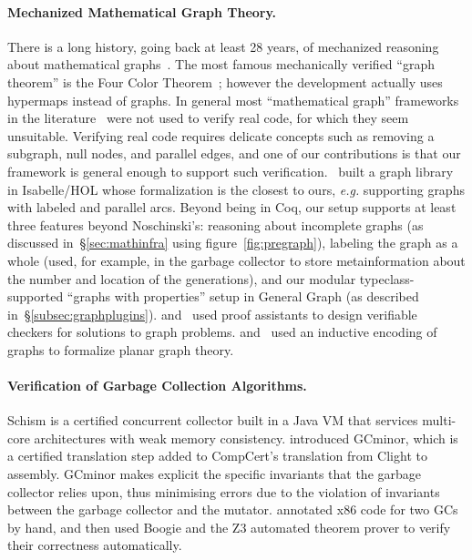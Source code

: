 \paragraph{Mechanized Mathematical Graph Theory.}
There is a long history, going back at least 28 years, of mechanized 
reasoning about mathematical graphs~\cite{wong1991}. 
The most famous mechanically verified “graph theorem” is the Four Color 
Theorem~\cite{gonthier2005computer}; however the development actually uses
hypermaps instead of graphs. In general most “mathematical graph” frameworks in 
the literature~\cite{wong1991, chou1994, yamamoto1995formalization, rwpgt1998, yamamoto1998formalization, tamai2000formal, duprat2001coq, ridge2005graphs, nipkow2016, dijkstra_shortest_path-afp} were not used to verify real 
code, for which they seem unsuitable. Verifying real code requires delicate concepts such as removing a subgraph, null nodes, and parallel edges, and one of our contributions is that our framework is general enough to support such verification. 
\citet{noschinski2015}~built a graph library in Isabelle/HOL whose formalization 
is the closest to ours, 
\emph{e.g.} supporting graphs with labeled and parallel arcs. 
Beyond being in Coq, our setup supports at least three features beyond 
Noschinski’s: reasoning about incomplete graphs (as discussed 
in~\S\ref{sec:mathinfra} using figure~\ref{fig:pregraph}), labeling the graph 
as a whole (used, for example, in the garbage collector to store 
metainformation about the number and location of the generations), and our 
modular typeclass-supported “graphs with properties” setup in General Graph 
(as described in~\S\ref{subsec:graphplugins}). 
\citet{dubois2015graphes} and \citet{noschinski2015formalizing}~used proof assistants to 
design verifiable checkers for solutions to graph problems. 
\citet{bauer20025} and \citet{yamamoto1995formalization}~used an inductive encoding of graphs to formalize planar graph theory.


\paragraph{Verification of Garbage Collection Algorithms.}
Schism \cite{gcexample4,gcexample4a} is a certified concurrent
collector built in a Java VM that services multi-core architectures with weak memory consistency.
\citet{gcexample5, gcexample3} introduced GCminor, which is
a certified translation step added to CompCert's translation from Clight to assembly.
GCminor makes explicit the specific invariants that the garbage collector
relies upon, thus minimising errors due to the violation of invariants
between the garbage collector and the mutator.
\citet{gcexample2} annotated x86 code
for two GCs by hand, and then used Boogie and the Z3 automated theorem prover
to verify their correctness automatically.

